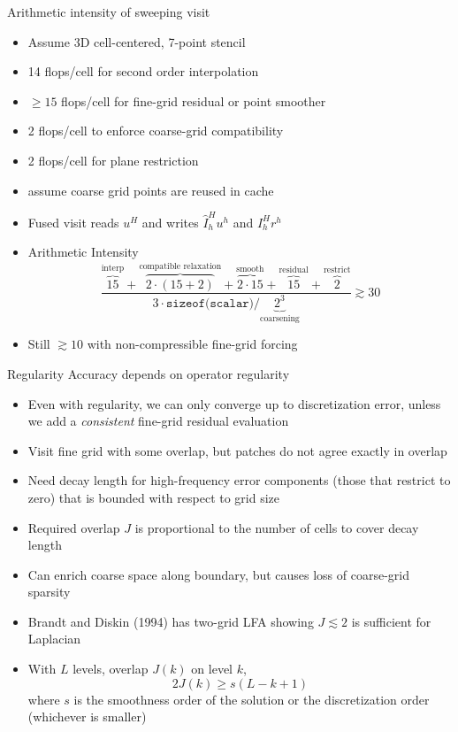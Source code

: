 \documentclass{beamer}
\begin{document}
\begin{frame}{Arithmetic intensity of sweeping visit}
  \begin{itemize}
  \item Assume 3D cell-centered, 7-point stencil
  \item 14 flops/cell for second order interpolation
  \item $\ge 15$ flops/cell for fine-grid residual or point smoother
  \item 2 flops/cell to enforce coarse-grid compatibility
  \item 2 flops/cell for plane restriction
  \item assume coarse grid points are reused in cache
  \item Fused visit reads $u^H$ and writes $\hat I_h^H u^h$ and $I_h^H r^h$
  \item Arithmetic Intensity
    \begin{equation}
      \frac{{\overbrace{15}^{\text{interp}}} + {\overbrace{2\cdot (15+2)}^{\text{compatible relaxation}}} + \overbrace{2\cdot 15}^{\text{smooth}} + \overbrace{15}^{\text{residual}} + \overbrace{2}^{\text{restrict}}}{3 \cdot \texttt{sizeof(scalar)} / \underbrace{2^3}_{\text{coarsening}}} \gtrsim 30
    \end{equation}
  \item Still $\gtrsim 10$ with non-compressible fine-grid forcing
  \end{itemize}
\end{frame}

\begin{frame}{Regularity}
  Accuracy depends on operator regularity
  \begin{itemize}
  \item Even with regularity, we can only converge up to discretization error, unless we add a \emph{consistent} fine-grid residual evaluation
  \item Visit fine grid with some overlap, but patches do not agree exactly in overlap
  \item Need decay length for high-frequency error components (those that restrict to zero) that is bounded with respect to grid size
  \item Required overlap $J$ is proportional to the number of cells to cover decay length
  \item Can enrich coarse space along boundary, but causes loss of coarse-grid sparsity
  \item Brandt and Diskin (1994) has two-grid LFA showing $J \lesssim 2$ is sufficient for Laplacian
  \item With $L$ levels, overlap $J(k)$ on level $k$,
    \begin{equation*}
      2J(k) \ge s (L-k+1)
    \end{equation*}
    where $s$ is the smoothness order of the solution or the discretization order (whichever is smaller)
  \end{itemize}
\end{frame}
\end{document}
